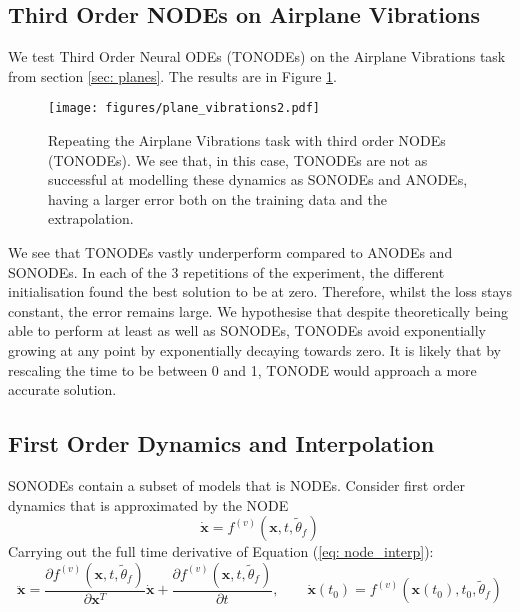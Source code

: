 \documentclass{article}
\theoremstyle{remark}
\theoremstyle{definition}
\begin{document}
\subsection{Third Order NODEs on Airplane Vibrations}
\label{app: plane_part_2}
We test Third Order Neural ODEs (TONODEs) on the Airplane Vibrations task from section \ref{sec: planes}. The results are in Figure \ref{fig: plane_part_2}.


\begin{figure}[t]
    \centering
    \texttt{[image: figures/plane\_vibrations2.pdf]}
    \caption{Repeating the Airplane Vibrations task with third order NODEs (TONODEs). We see that, in this case, TONODEs are not as successful at modelling these dynamics as SONODEs and ANODEs, having a larger error both on the training data and the extrapolation.}
    \label{fig: plane_part_2}
\end{figure}

We see that TONODEs vastly underperform compared to ANODEs and SONODEs. In each of the 3 repetitions of the experiment, the different initialisation found the best solution to be at zero. Therefore, whilst the loss stays constant, the error remains large. We hypothesise that despite theoretically being able to perform at least as well as SONODEs, TONODEs avoid exponentially growing at any point by exponentially decaying towards zero. It is likely that by rescaling the time to be between 0 and 1, TONODE would approach a more accurate solution.

\subsection{First Order Dynamics and Interpolation}

SONODEs contain a subset of models that is NODEs. Consider first order dynamics that is approximated by the NODE
\begin{equation}
\label{eq: node_interp}
    \dot{\mathbf{x}} = f^{(v)}(\mathbf{x}, t, \tilde{\theta}_{f})
\end{equation}
Carrying out the full time derivative of Equation (\ref{eq: node_interp}):
\begin{equation}
    \ddot{\mathbf{x}} = \frac{\partial f^{(v)}(\mathbf{x}, t, \tilde{\theta}_{f})}{\partial \mathbf{x}^{T}}\dot{\mathbf{x}}
    +
    \frac{\partial f^{(v)}(\mathbf{x}, t, \tilde{\theta}_{f})}{\partial t}
    ,\qquad
    \dot{\mathbf{x}}(t_{0}) = f^{(v)}(\mathbf{x}(t_{0}), t_{0}, \tilde{\theta}_{f})
\end{equation}
\end{document}

